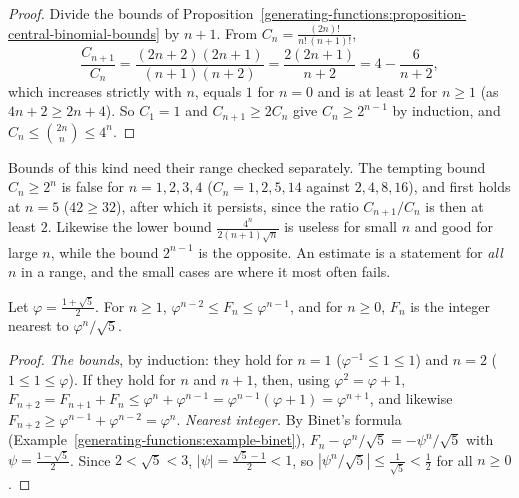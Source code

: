 \begin{proof}
Divide the bounds of Proposition~\ref{generating-functions:proposition-central-binomial-bounds} by $n + 1$. From $C_n = \frac{(2n)!}{n!\,(n + 1)!}$,
\[
\frac{C_{n+1}}{C_n} = \frac{(2n + 2)(2n + 1)}{(n + 1)(n + 2)} = \frac{2(2n + 1)}{n + 2} = 4 - \frac{6}{n + 2},
\]
which increases strictly with $n$, equals $1$ for $n = 0$ and is at least $2$ for $n \geq 1$ (as $4n + 2 \geq 2n + 4$). So $C_1 = 1$ and $C_{n+1} \geq 2C_n$ give $C_n \geq 2^{n-1}$ by induction, and
$C_n \leq \binom{2n}{n} \leq 4^n$.
\end{proof}

\begin{counterexample}\label{generating-functions:counterexample-small-cases}
Bounds of this kind need their range checked separately. The tempting bound $C_n \geq 2^n$ is false for $n = 1, 2, 3, 4$ ($C_n = 1, 2, 5, 14$ against $2, 4, 8, 16$), and first holds at $n = 5$
($42 \geq 32$), after which it persists, since the ratio $C_{n+1}/C_n$ is then at least $2$. Likewise the lower bound $\frac{4^n}{2(n + 1)\sqrt{n}}$ is useless for small $n$ and good for large $n$,
while the bound $2^{n-1}$ is the opposite. An estimate is a statement for \emph{all} $n$ in a range, and the small cases are where it most often fails.
\end{counterexample}

\begin{proposition}\label{generating-functions:proposition-fibonacci-bounds}
Let $\varphi = \frac{1 + \sqrt{5}}{2}$. For $n \geq 1$, $\varphi^{n-2} \leq F_n \leq \varphi^{n-1}$, and for $n \geq 0$, $F_n$ is the integer nearest to $\varphi^n/\sqrt{5}$.
\end{proposition}

\begin{proof}
\emph{The bounds}, by induction: they hold for $n = 1$ ($\varphi^{-1} \leq 1 \leq 1$) and $n = 2$ ($1 \leq 1 \leq \varphi$). If they hold for $n$ and $n + 1$, then, using $\varphi^2 = \varphi + 1$,
$F_{n+2} = F_{n+1} + F_n \leq \varphi^n + \varphi^{n-1} = \varphi^{n-1}(\varphi + 1) = \varphi^{n+1}$, and likewise $F_{n+2} \geq \varphi^{n-1} + \varphi^{n-2} = \varphi^n$.
\emph{Nearest integer.} By Binet's formula (Example~\ref{generating-functions:example-binet}), $F_n - \varphi^n/\sqrt{5} = -\psi^n/\sqrt{5}$ with $\psi = \frac{1 - \sqrt{5}}{2}$. Since $2 < \sqrt{5} < 3$,
$|\psi| = \frac{\sqrt{5} - 1}{2} < 1$, so $|\psi^n/\sqrt{5}| \leq \frac{1}{\sqrt{5}} < \frac{1}{2}$ for all $n \geq 0$.
\end{proof}

